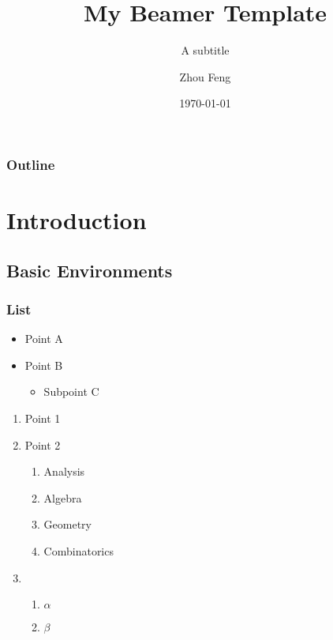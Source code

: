 \documentclass{beamer}
\title[Short Title]{My Beamer Template}
\subtitle{A subtitle}
\author[Z. Feng]{Zhou Feng}
\institute[CUHK]{The Chinese University of Hong Kong}
\date{\today}
\begin{document}
\begin{frame}[plain]
	\maketitle
\end{frame}

\begin{frame}\label{contents}
	\frametitle{Outline}
	\tableofcontents
\end{frame}



\section{Introduction} \label{sec:intro}
\subsection{Basic Environments}
\begin{frame}
	\frametitle{List}
	\begin{itemize}
		\item Point A
		\item Point B
		      \begin{itemize}
			      \item Subpoint C
		      \end{itemize}
	\end{itemize}

	\begin{enumerate}
		\item Point 1 \pause
		\item Point 2
		      \begin{enumerate}[I]
			      \item Analysis
			      \item Algebra
			      \item Geometry
			      \item Combinatorics
		      \end{enumerate}
		\item
		      \begin{enumerate}[i]
			      \item $ \alpha $
			      \item $ \beta $
		      \end{enumerate}
	\end{enumerate}

\end{frame}
\end{document}
